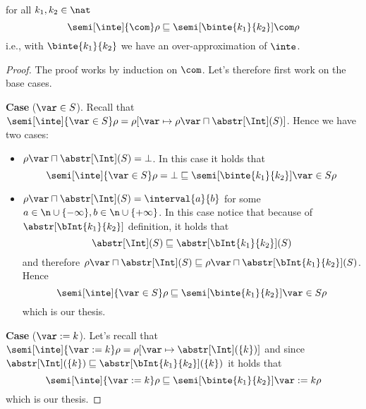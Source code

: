 \begin{lemma}\label{le:leq}
  for all \(k_1, k_2\in\nat\)%
  \begin{equation*}
    \semi[\inte]{\com}\rho \sqsubseteq \semi[\binte{k_1}{k_2}]{\com}\rho
  \end{equation*}
  i.e., with \(\binte{k_1}{k_2}\) we have an over-approximation of \(\inte\).
\end{lemma}
\begin{proof}
  The proof works by induction on \(\com\). Let's therefore first work
  on the base cases.

  \medskip

  \noindent
  \textbf{Case} (\(\var \in S\)).
  Recall that
  \(\semi[\inte]{\var\in S}\rho = \rho[\var \mapsto {\rho\var \sqcap
    \abstr[\Int](S)}]\). Hence we have two cases:
  \begin{itemize}
  \item \({\rho\var \sqcap \abstr[\Int](S)} = \bot\). In this case it
    holds that
    \begin{equation*}
      \semi[\inte]{\var\in S}\rho = \bot \sqsubseteq \semi[\binte{k_1}{k_2}]{\var\in S}\rho
    \end{equation*}
    
  \item \({\rho\var \sqcap \abstr[\Int](S)} = \interval{a}{b}\) for
    some \({a \in \n \cup \{-\infty\}}, {b \in
      \n\cup\{+\infty\}}\). In this case notice that because of
    \(\abstr[\bInt{k_1}{k_2}]\) definition, it holds that
    \begin{equation*}
      \abstr[\Int](S) \sqsubseteq \abstr[\bInt{k_1}{k_2}](S)
    \end{equation*}
    and therefore
    \({\rho\var \sqcap \abstr[\Int](S)} \sqsubseteq {\rho\var \sqcap
      \abstr[\bInt{k_1}{k_2}](S)}\). Hence
    \begin{equation*}
      {\semi[\inte]{\var\in S}\rho} \sqsubseteq {\semi[\binte{k_1}{k_2}]{\var\in S}\rho}
    \end{equation*}
    which is our thesis.
  \end{itemize}

  \medskip

  \noindent
  \textbf{Case} (\(\var := k\)).
  Let's recall that
  \({\semi[\inte]{\var := k}\rho = \rho[\var \mapsto
    \abstr[\Int](\{k\})]}\) and since
  \({\abstr[\Int](\{k\})} \sqsubseteq {\abstr[\bInt{k_1}{k_2}](\{k\})}\) it holds
  that
  \begin{equation*}
    \semi[\inte]{\var := k}\rho \sqsubseteq \semi[\binte{k_1}{k_2}]{\var := k}\rho
  \end{equation*}
  which is our thesis.


\end{proof}
